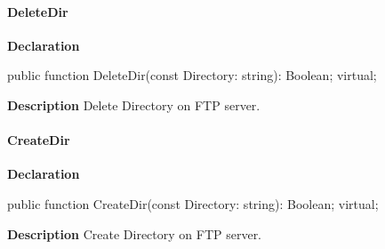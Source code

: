 \documentclass{report}
\newif\ifpdf
\begin{document}
\paragraph*{DeleteDir}\hspace*{\fill}

\label{ftpsend.TFTPSend-DeleteDir}
\begin{list}{}{
\setlength{\itemindent}{0cm}
\setlength{\listparindent}{0cm}
\setlength{\leftmargin}{\evensidemargin}
\addtolength{\leftmargin}{\tmplength}
\settowidth{\labelsep}{X}
\addtolength{\leftmargin}{\labelsep}
\setlength{\labelwidth}{\tmplength}
}
\item[\textbf{Declaration}\hfill]
\ifpdf
\begin{flushleft}
\fi
\begin{ttfamily}
public function DeleteDir(const Directory: string): Boolean; virtual;\end{ttfamily}

\ifpdf
\end{flushleft}
\fi

\par
\item[\textbf{Description}]
Delete Directory on FTP server.

\end{list}
\paragraph*{CreateDir}\hspace*{\fill}

\label{ftpsend.TFTPSend-CreateDir}
\begin{list}{}{
\setlength{\itemindent}{0cm}
\setlength{\listparindent}{0cm}
\setlength{\leftmargin}{\evensidemargin}
\addtolength{\leftmargin}{\tmplength}
\settowidth{\labelsep}{X}
\addtolength{\leftmargin}{\labelsep}
\setlength{\labelwidth}{\tmplength}
}
\item[\textbf{Declaration}\hfill]
\ifpdf
\begin{flushleft}
\fi
\begin{ttfamily}
public function CreateDir(const Directory: string): Boolean; virtual;\end{ttfamily}

\ifpdf
\end{flushleft}
\fi

\par
\item[\textbf{Description}]
Create Directory on FTP server.

\end{list}
\end{document}
